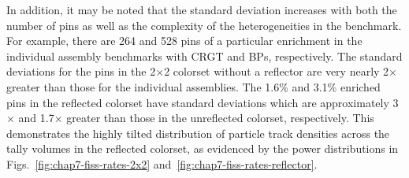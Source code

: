 In addition, it may be noted that the standard deviation increases with both the number of pins as well as the complexity of the heterogeneities in the benchmark. For example, there are 264 and 528 pins of a particular enrichment in the individual assembly benchmarks with \ac{CRGT} and \acp{BP}, respectively. The standard deviations for the pins in the 2$\times$2 colorset without a reflector are very nearly 2$\times$ greater than those for the individual assemblies. The 1.6\% and 3.1\% enriched pins in the reflected colorset have standard deviations which are approximately 3$\times$ and 1.7$\times$ greater than those in the unreflected colorset, respectively. This demonstrates the highly tilted distribution of particle track densities across the tally volumes in the reflected colorset, as evidenced by the power distributions in Figs.~\ref{fig:chap7-fiss-rates-2x2} and~\ref{fig:chap7-fiss-rates-reflector}.

